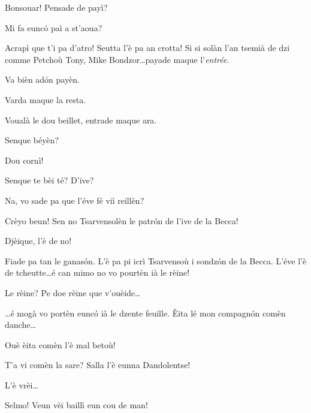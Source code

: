 \begin{drama}

\Dorinaspeaks{} Bonsouar! Pensade de payì?

\Pinospeaks	Mi fa eunc\'o paì a st'aoua?

\Genespeaks{}	Acrapì que t'i pa d'atro! Seutta l'è pa an crotta! Si si solàn l'an tsemià de dzi comme  Petchoù Tony, Mike Bondzor\ldots payade maque l'\textit{entrée}.

\Pinospeaks{} Va bièn ad\'on payèn.


\Pinospeaks{} Varda maque la resta.

\Dorinaspeaks Voualà le dou beillet, entrade maque ara.


\Pinospeaks{} Senque béyèn?

\Geppinospeaks{} Dou cornì!


\Pinospeaks {} Senque te bèi té? D'ive? 

\Walterspeaks	Na, vo sade pa que l'éve fé viì reillèn?

\Pinospeaks	Crèyo beun! Sen no Tsarvensolèn le patr\'on de l'ive de la Becca!

\Geppinospeaks{} Djèique, l'è de no!

\Walterspeaks	Fiade pa tan le ganas\'on. L'è pa pi icrì Tsarvensoù i sondz\'on de la Becca. L'éve l'è de tcheutte\ldots é can mimo no vo pourtèn ià le rèine!

\Pinospeaks Le rèine? Pe doe rèine que v'ouèide\ldots

\Walterspeaks \ldots é mogà vo portèn eunc\'o ià le dzente feuille.  \`Eita lé mon compagn\'on comèn danche\ldots

\Pinospeaks Ouè èita comèn l'è mal betoù!

\Walterspeaks T'a vi comèn la sare? Salla l'è eunna Dandolentse!

\Pinospeaks{} L'è vrèi\ldots

\Walterspeaks Selmo! Veun vèi baillì eun cou de man!
 

\end{drama}
